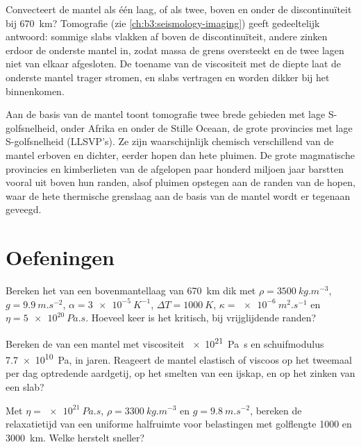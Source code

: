 Convecteert de mantel als één laag, of als twee, boven en onder de
discontinuïteit bij \qty{670}{km}? Tomografie (zie \cref{ch:b3:seismology-imaging})
geeft gedeeltelijk antwoord: sommige slabs vlakken af boven de discontinuïteit, andere
zinken erdoor de onderste mantel in, zodat massa de grens oversteekt en de twee lagen niet
van elkaar afgesloten. De toename van de viscositeit met de diepte laat de onderste
mantel trager stromen, en slabs vertragen en worden dikker bij het binnenkomen.

Aan de basis van de mantel toont tomografie twee brede gebieden met lage S-golfsnelheid,
onder Afrika en onder de Stille Oceaan, de grote
provincies met lage S-golfsnelheid (LLSVP's). Ze zijn waarschijnlijk chemisch verschillend van de mantel erboven
en dichter, eerder hopen dan hete pluimen. De grote magmatische provincies en
kimberlieten van de afgelopen paar honderd miljoen jaar barstten vooral uit boven hun
randen, alsof pluimen opstegen aan de randen van de hopen, waar de hete
thermische grenslaag aan de basis van de mantel wordt er tegenaan geveegd.

\section{Oefeningen}

\begin{exercise}[$\star$]\label{exo:b3:mantle-convection:1}
Bereken het  van een bovenmantellaag van \qty{670}{km} dik met
$\rho = \qty{3500}{kg.m^{-3}}$, $g = \qty{9.9}{m.s^{-2}}$, $\alpha =
\qty{3e-5}{K^{-1}}$, $\Delta T = \qty{1000}{K}$, $\kappa =
\qty{e-6}{m^2.s^{-1}}$ en $\eta = \qty{5e20}{Pa.s}$. Hoeveel keer is het kritisch,
bij vrijglijdende randen?
\end{exercise}

\begin{exercise}[$\star$]\label{exo:b3:mantle-convection:2}
Bereken de  van een mantel met viscositeit \qty{e21}{Pa.s} en
schuifmodulus \qty{7.7e10}{Pa}, in jaren. Reageert de mantel elastisch of
viscoos op het tweemaal per dag optredende aardgetij, op het smelten van een
ijskap, en op het zinken van een slab?
\end{exercise}

\begin{exercise}[$\star$]\label{exo:b3:mantle-convection:3}
Met $\eta = \qty{e21}{Pa.s}$, $\rho = \qty{3300}{kg.m^{-3}}$ en $g =
\qty{9.8}{m.s^{-2}}$, bereken de relaxatietijd van een uniforme halfruimte voor
belastingen met golflengte 1000 en \qty{3000}{km}. Welke herstelt sneller?
\end{exercise}

